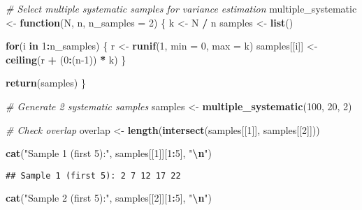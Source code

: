 \documentclass[
]{article}
\newenvironment{Shaded}{\begin{snugshade}}{\end{snugshade}}
\newcommand{\AttributeTok}[1]{\textcolor[rgb]{0.13,0.29,0.53}{#1}}
\newcommand{\CommentTok}[1]{\textcolor[rgb]{0.56,0.35,0.01}{\textit{#1}}}
\newcommand{\ControlFlowTok}[1]{\textcolor[rgb]{0.13,0.29,0.53}{\textbf{#1}}}
\newcommand{\DecValTok}[1]{\textcolor[rgb]{0.00,0.00,0.81}{#1}}
\newcommand{\FunctionTok}[1]{\textcolor[rgb]{0.13,0.29,0.53}{\textbf{#1}}}
\newcommand{\NormalTok}[1]{#1}
\newcommand{\OtherTok}[1]{\textcolor[rgb]{0.56,0.35,0.01}{#1}}
\newcommand{\SpecialCharTok}[1]{\textcolor[rgb]{0.81,0.36,0.00}{\textbf{#1}}}
\newcommand{\StringTok}[1]{\textcolor[rgb]{0.31,0.60,0.02}{#1}}
\begin{document}
\begin{Shaded}
\begin{Highlighting}[]
\CommentTok{\# Select multiple systematic samples for variance estimation}
\NormalTok{multiple\_systematic }\OtherTok{\textless{}{-}} \ControlFlowTok{function}\NormalTok{(N, n, }\AttributeTok{n\_samples =} \DecValTok{2}\NormalTok{) \{}
\NormalTok{  k }\OtherTok{\textless{}{-}}\NormalTok{ N }\SpecialCharTok{/}\NormalTok{ n}
\NormalTok{  samples }\OtherTok{\textless{}{-}} \FunctionTok{list}\NormalTok{()}
  
  \ControlFlowTok{for}\NormalTok{(i }\ControlFlowTok{in} \DecValTok{1}\SpecialCharTok{:}\NormalTok{n\_samples) \{}
\NormalTok{    r }\OtherTok{\textless{}{-}} \FunctionTok{runif}\NormalTok{(}\DecValTok{1}\NormalTok{, }\AttributeTok{min =} \DecValTok{0}\NormalTok{, }\AttributeTok{max =}\NormalTok{ k)}
\NormalTok{    samples[[i]] }\OtherTok{\textless{}{-}} \FunctionTok{ceiling}\NormalTok{(r }\SpecialCharTok{+}\NormalTok{ (}\DecValTok{0}\SpecialCharTok{:}\NormalTok{(n}\DecValTok{{-}1}\NormalTok{)) }\SpecialCharTok{*}\NormalTok{ k)}
\NormalTok{  \}}
  
  \FunctionTok{return}\NormalTok{(samples)}
\NormalTok{\}}

\CommentTok{\# Generate 2 systematic samples}
\NormalTok{samples }\OtherTok{\textless{}{-}} \FunctionTok{multiple\_systematic}\NormalTok{(}\DecValTok{100}\NormalTok{, }\DecValTok{20}\NormalTok{, }\DecValTok{2}\NormalTok{)}

\CommentTok{\# Check overlap}
\NormalTok{overlap }\OtherTok{\textless{}{-}} \FunctionTok{length}\NormalTok{(}\FunctionTok{intersect}\NormalTok{(samples[[}\DecValTok{1}\NormalTok{]], samples[[}\DecValTok{2}\NormalTok{]]))}

\FunctionTok{cat}\NormalTok{(}\StringTok{"Sample 1 (first 5):"}\NormalTok{, samples[[}\DecValTok{1}\NormalTok{]][}\DecValTok{1}\SpecialCharTok{:}\DecValTok{5}\NormalTok{], }\StringTok{"}\SpecialCharTok{\textbackslash{}n}\StringTok{"}\NormalTok{)}
\end{Highlighting}
\end{Shaded}

\begin{verbatim}
## Sample 1 (first 5): 2 7 12 17 22
\end{verbatim}

\begin{Shaded}
\begin{Highlighting}[]
\FunctionTok{cat}\NormalTok{(}\StringTok{"Sample 2 (first 5):"}\NormalTok{, samples[[}\DecValTok{2}\NormalTok{]][}\DecValTok{1}\SpecialCharTok{:}\DecValTok{5}\NormalTok{], }\StringTok{"}\SpecialCharTok{\textbackslash{}n}\StringTok{"}\NormalTok{)}
\end{Highlighting}
\end{Shaded}
\end{document}
